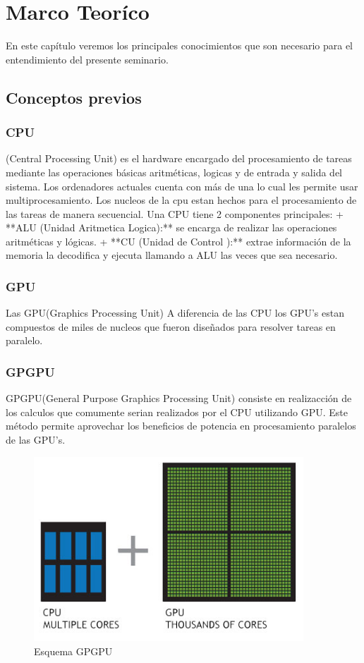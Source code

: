 \chapter{Marco Teoríco}

En este capítulo veremos los principales conocimientos que son necesario para el entendimiento del presente seminario.
\section{Conceptos previos}
\subsection{CPU}(Central Processing Unit) es el hardware encargado del procesamiento de tareas mediante las operaciones básicas aritméticas, logicas y de entrada y salida del sistema. Los ordenadores actuales cuenta con más de una lo cual les permite usar multiprocesamiento. Los nucleos de la cpu estan hechos para el procesamiento de las tareas de manera secuencial.
Una CPU tiene 2 componentes principales:
+ **ALU (Unidad Aritmetica Logica):** se encarga de realizar las operaciones aritméticas y lógicas.
+ **CU  (Unidad de Control       ):** extrae información de la memoria la decodifica y ejecuta llamando a ALU las veces que sea necesario.

\subsection{GPU}
Las GPU(Graphics Processing Unit)
A diferencia de las CPU los GPU's estan compuestos de miles de nucleos que fueron diseñados para resolver tareas en paralelo.

\subsection{GPGPU} 
GPGPU(General Purpose Graphics Processing Unit) consiste en realizacción de los calculos que comumente serian realizados por el CPU utilizando GPU. Este método permite aprovechar los beneficios de potencia en procesamiento paralelos de las GPU's.
\begin{figure}[H]
	\centering
	\includegraphics[width=0.9\textwidth]{Figures/cpu-and-gpu.jpg}
	\caption{Esquema GPGPU}
	\label{MVC}
\end{figure}



